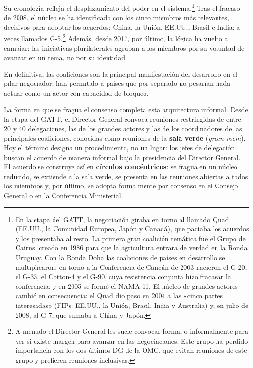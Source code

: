 \documentclass[10pt,a4paper]{article}
\begin{document}
Su cronología refleja el desplazamiento del poder en el sistema.\footnote{%
  En la etapa del GATT, la negociación giraba en torno al llamado Quad (EE.UU., la Comunidad Europea, Japón y Canadá), que pactaba los acuerdos y los presentaba al resto. La primera gran coalición temática fue el Grupo de Cairns, creado en 1986 para que la agricultura entrara de verdad en la Ronda Uruguay. Con la Ronda Doha las coaliciones de países en desarrollo se multiplicaron: en torno a la Conferencia de Cancún de 2003 nacieron el G-20, el G-33, el Cotton-4 y el G-90, cuya resistencia conjunta hizo fracasar la conferencia; y en 2005 se formó el NAMA-11. El núcleo de grandes actores cambió en consecuencia: el Quad dio paso en 2004 a las «cinco partes interesadas» (FIPs: EE.UU., la Unión, Brasil, India y Australia) y, en julio de 2008, al G-7, que sumaba a China y Japón. 
} Tras el fracaso de 2008, el núcleo se ha identificado con los cinco miembros más relevantes, decisivos para adoptar los acuerdos: China, la Unión, EE.UU., Brasil e India; a veces llamados G-5.\footnote{%
  A menudo el Director General les suele convocar formal o informalmente para ver si existe margen para avanzar en las negociaciones. Este grupo ha perdido importancia con los dos últimos DG de la OMC, que evitan reuniones de este grupo y prefieren reuniones inclusivas.
} Además, desde 2017, por último, la lógica ha vuelto a cambiar: las iniciativas plurilaterales agrupan a los miembros por su voluntad de avanzar en un tema, no por su identidad.

En definitiva, las coaliciones son la principal manifestación del desarrollo en el pilar negociador: han permitido a países que por separado no pesarían nada actuar como un actor con capacidad de bloqueo.

La forma en que se fragua el consenso completa esta arquitectura informal. Desde la etapa del GATT, el Director General convoca reuniones restringidas de entre $20$ y $40$ delegaciones, las de los grandes actores y las de los coordinadores de las principales coaliciones, conocidas como reuniones de la \textbf{sala verde} (\textit{green room}). Hoy el término designa un procedimiento, no un lugar: los jefes de delegación buscan el acuerdo de manera informal bajo la presidencia del Director General. El acuerdo se construye así en \textbf{círculos concéntricos}: se fragua en un núcleo reducido, se extiende a la sala verde, se presenta en las reuniones abiertas a todos los miembros y, por último, se adopta formalmente por consenso en el Consejo General o en la Conferencia Ministerial. 
\end{document}
